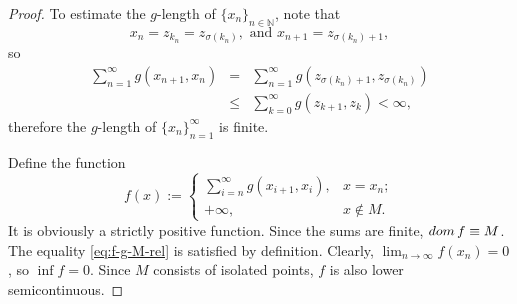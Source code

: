 \documentclass[10pt,a4paper]{amsart}
\def\dom{\mathop{\rm dom}}
\newcommand{\be}{\begin{equation}}
\newcommand{\ee}{\end{equation}}
\begin{document}
\begin{proof}
    To estimate the $g$-length of $\{x_n\}_{n\in\mathbb{N}}$, note that
    $$
        x_n = z_{k_n} = z_{\sigma(k_n)},\text{ and }x_{n+1} = z_{\sigma(k_n)+1},
    $$
    so
    \begin{eqnarray*}
        \sum_{n=1}^\infty g(x_{n+1},x_n) &=& \sum_{n=1}^\infty g(z_{\sigma(k_n)+1},z_{\sigma(k_n)}) \\
        &\le& \sum_{k=0}^\infty g(z_{k+1},z_k) < \infty,
    \end{eqnarray*}
    therefore the $g$-length of $\{x_n\}_{n=1}^\infty$ is finite.

    Define the function
\be\label{eq:f}
f(x):= \left \{\begin{array}{rl} \sum_{i=n}^{\infty} g(x_{i+1},x_{i}), & x = x_{n};  \\
+\infty, & x\notin M.\end{array} \right.
\ee
It is obviously a   strictly positive function. Since the sums are finite, $\dom f\equiv M$. The equality \eqref{eq:f-g-M-rel} is satisfied by definition. Clearly, $\lim_{n\to\infty} f(x_n) = 0$, so $\inf f = 0$. Since $M$ consists of isolated points, $f$ is also lower semicontinuous.
\end{proof}
\end{document}
